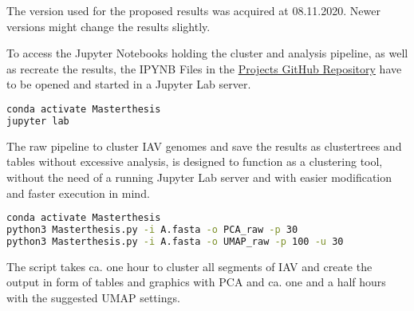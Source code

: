 The version used for the proposed results was acquired at 08.11.2020. Newer versions might change the results slightly.





To access the Jupyter Notebooks holding the cluster and analysis pipeline, as well as recreate the results, the IPYNB Files in the \href{https://github.com/ahenoch/Masterthesis.git}{Projects GitHub Repository} have to be opened and started in a Jupyter Lab server.

\begin{lstlisting}[language=sh]
conda activate Masterthesis
jupyter lab
\end{lstlisting}  

The raw pipeline to cluster \gls{IAV} genomes and save the results as clustertrees and tables without excessive analysis, is designed to function as a clustering tool, without the need of a running Jupyter Lab server and with easier modification and faster execution in mind.

\begin{lstlisting}[language=sh]
conda activate Masterthesis
python3 Masterthesis.py -i A.fasta -o PCA_raw -p 30
python3 Masterthesis.py -i A.fasta -o UMAP_raw -p 100 -u 30
\end{lstlisting}  

The script takes ca. one hour to cluster all segments of \gls{IAV} and create the output in form of tables and graphics with \gls{PCA} and ca. one and a half hours with the suggested \gls{UMAP} settings.

